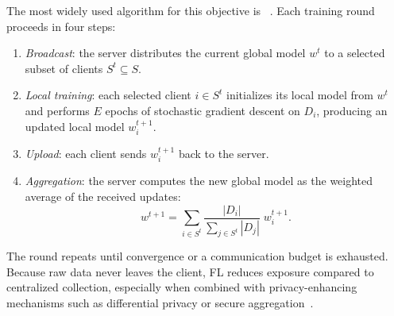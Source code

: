 The most widely used algorithm for this objective is
 ~\cite{DBLP:conf/aistats/McMahanMRHA17}.
%
Each training round proceeds in four steps:

\begin{enumerate}
  \item \emph{Broadcast}: the server distributes the current global model
    $w^t$ to a selected subset of clients $S^t \subseteq S$.
  \item \emph{Local training}: each selected client $i \in S^t$ initializes
    its local model from $w^t$ and performs $E$ epochs of stochastic
    gradient descent on $D_i$, producing an updated local model $w_i^{t+1}$.
  \item \emph{Upload}: each client sends $w_i^{t+1}$ back to the server.
  \item \emph{Aggregation}: the server computes the new global model as the
    weighted average of the received updates:
    \begin{equation}
      w^{t+1} = \sum_{i \in S^t} \frac{|D_i|}{\sum_{j \in S^t} |D_j|} \; w_i^{t+1}.
    \end{equation}
\end{enumerate}

\noindent
The round repeats until convergence or a communication budget is exhausted.
%
Because raw data never leaves the client,
 \gls{FL} reduces exposure compared to centralized collection,
 especially when combined with privacy-enhancing mechanisms
 such as differential privacy or secure aggregation~\cite{DBLP:journals/ftml/KairouzMABBBBCC21}.


